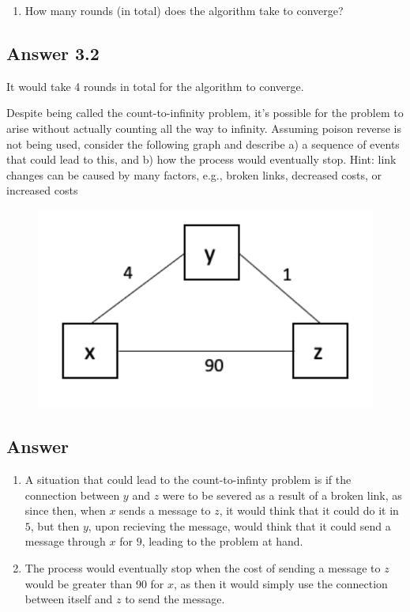 \documentclass[10pt]{article}
\newenvironment{problem}[2][Problem]{\begin{trivlist}
\item[\hskip \labelsep {\bfseries #1}\hskip \labelsep {\bfseries #2.}]}{\end{trivlist}}
\begin{document}
\begin{problem}{3: Distance Vector Protocol}
\begin{enumerate}
\item How many rounds (in total) does the algorithm take to converge?
\end{enumerate}
\subsection*{Answer 3.2}
    It would take 4 rounds in total for the algorithm to converge.

\end{problem}
\begin{problem} {4: Count to Infinity}

Despite being called the count-to-infinity problem, it's possible for the problem to arise without actually counting all the way to infinity. Assuming poison reverse is not being used, consider the following graph and describe a) a sequence of events that could lead to this, and b) how the process would eventually stop. Hint: link changes can be caused by many factors, e.g., broken links, decreased costs, or increased costs

\begin{figure}[h]
    \centering
    \includegraphics[scale=0.5]{figures/count_inf.pdf}
    \label{fig:count}
\end{figure}

\end{problem}
\subsection*{Answer}
\begin{enumerate}
    \item[(a)] A situation that could lead to the count-to-infinty problem is if the connection between $y$ and $z$ were to be severed as a result of a broken link, as since then, when $x$ sends a message to $z$, it would think that it could do it in $5$, but then $y$, upon recieving the message, would think that it could send a message through $x$ for $9$, leading to the problem at hand.
    \item[(b)] The process would eventually stop when the cost of sending a message to $z$ would be greater than 90 for $x$, as then it would simply use the connection between itself and $z$ to send the message.
\end{enumerate}
\end{document}
